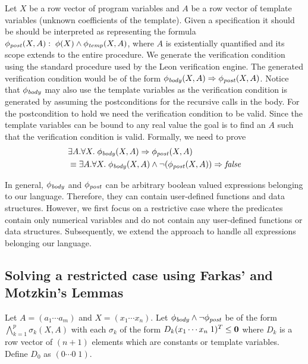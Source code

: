 \documentclass[a4paper,10pt]{article}
\begin{document}
Let $X$ be a row vector of program variables and $A$ be a row vector of  template variables (unknown coefficients of the template).
Given a specification  it should be should be interpreted as representing the formula $\mathit{\phi_{post}}(X,A): \; \phi(X) \wedge \mathit{\phi_{temp}}(X,A)$, where $A$ is existentially quantified
and its scope extends to the entire procedure.
We generate the verification condition using the standard procedure used by the Leon verification engine.
The generated verification condition would be of the form $\mathit{\phi_{body}}(X,A) \Rightarrow \mathit{\phi_{post}}(X,A)$. Notice that $\mathit{\phi_{body}}$ may also use the template variables as the verification condition is generated by assuming the postconditions for the recursive calls in the body.
For the postcondition to hold we need the verification condition to be valid. Since the template variables can be bound to any real value the goal is to find an $A$ such that the verification condition is valid. Formally, we need to prove
%
\begin{align}
& \exists A. \forall X. \; \mathit{\phi_{body}}(X,A) \Rightarrow \mathit{\phi_{post}}(X,A) \\
& \equiv  \exists A. \forall X. \; \mathit{\phi_{body}}(X,A) \wedge \neg(\mathit{\phi_{post}}(X,A)) \Rightarrow \mathit{false}
\label{eq:tempvc}
\end{align}

In general, $\mathit{\phi_{body}}$ and $\mathit{\phi_{post}}$ can be arbitrary boolean valued expressions belonging to our language. Therefore, they can contain user-defined functions and data structures.
However, we first focus on a restrictive case where the predicates contain only numerical variables and 
do not contain any user-defined functions or data structures.
Subsequently, we extend the approach to handle all expressions belonging our language.

\subsection{Solving a restricted case using Farkas' and Motzkin's Lemmas}

Let $A = (a_1 \cdots a_m)$ and $X = (x_1 \cdots x_n)$.
Let $\mathit{\phi_{body}} \wedge \neg \mathit{\phi_{post}}$ be of the form 
$\bigwedge \limits_{k=1}^{p} \sigma_k(X,A)$ with each $\sigma_k$ of the form 
$D_k (x_1 \cdots x_n \; 1)^T \le \mathbf{0}$ where $D_k$ is a row vector of $(n+1)$ elements
which are constants or template variables.
Define $D_0$ as $(0 \cdots 0 \; 1)$.
\end{document}
